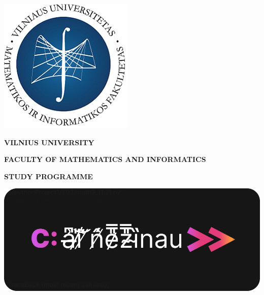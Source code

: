 \begin{titlepage}
\vskip 20pt
\begin{center}
\includegraphics[scale=0.55]{images/MIF.png}
\end{center}

\makeatletter

\vskip 20pt
\centerline{\bf \large \textbf{VILNIUS UNIVERSITY}}
\vskip 10pt
\centerline{\large \textbf{FACULTY OF MATHEMATICS AND INFORMATICS}}
\vskip 10pt
\centerline{\large \textbf{\MakeUppercase{\@studyprogramme \space study programme}}}

\vskip 80pt
\centerline{\Large \@worktype}
\vskip 20pt
\begin{center}
    {\bf \LARGE \@worktitle}
\end{center}
\begin{center}
    {\bf \Large \@secondworktitle}
\end{center}
\vskip 80pt

\begin{center}
    \includegraphics[scale=0.15]{images/logo.png}
\end{center}
\vskip 20pt

\centering{\Large \@workauthor}
{
\vskip 10pt
\centering{\Large \@secondauthor}
}
\vskip 20pt




\end{titlepage}
